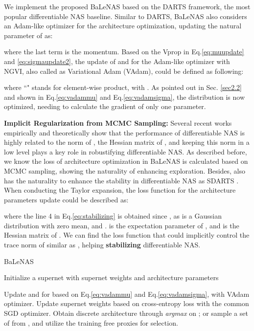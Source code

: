 \documentclass[10pt,twocolumn,letterpaper]{article}
\begin{document}
We implement the proposed BaLeNAS based on the DARTS \cite{liu2018darts} framework, the most popular differentiable NAS baseline. Similar to DARTS, BaLeNAS also considers an Adam-like optimizer for the architecture optimization, updating the natural parameter  of  as:

where the last term is the momentum. Based on the Vprop in Eq.\eqref{eq:muupdate} and \eqref{eq:sigmaupdate2}, the update of  and  for the Adam-like optimizer with NGVI, also called as Variational Adam (VAdam), could be defined as following:


where ``" stands for element-wise product,  with . As pointed out in Sec. \ref{sec2.2} and shown in Eq.\eqref{eq:vadammu} and Eq.\eqref{eq:vadamsigma}, the distribution   is now optimized, needing to calculate the gradient of only one parameter. 


\vspace{1mm}
\noindent\textbf{Implicit Regularization from MCMC Sampling:}
Several recent works \cite{zela2019understanding,chen2020stabilizing,chen2020drnas} empirically and theoretically show that the performance of differentiable NAS is highly related to the norm of , the Hessian matrix of , and keeping this norm in a low level plays a key role in robustifying differentiable NAS. As described before, we know the loss  of architecture optimization in BaLeNAS is calculated based on MCMC sampling, showing the naturality of enhancing exploration. Besides,  also has the naturality to enhance the stability in differentiable NAS as SDARTS \cite{chen2020stabilizing}. When conducting the Taylor expansion, the loss function for the architecture parameters update  could be described as: 

where the line 4 in Eq.\eqref{eq:stabilizing} is obtained since , as  is a Gaussian distribution with zero mean, and .  is the expectation parameter of , and  is the Hessian matrix of . We can find the loss function that could implicitly control the trace norm of  similar as \cite{chen2020stabilizing,chen2020drnas}, helping \textbf{stabilizing} differentiable NAS.





\begin{algorithm}[t]
\caption{BaLeNAS}
\label{alg:algorithm1}
Initialize a supernet with supernet weights  and architecture parameters 
\begin{algorithmic}[2]
\STATE Update {\color{red}  and  for  based on Eq.\eqref{eq:vadammu} and Eq.\eqref{eq:vadamsigma}, with VAdam optimizer.}
\STATE Update supernet weights  based on cross-entropy loss with the common SGD optimizer.
\ENDWHILE
\STATE Obtain discrete architecture  through \textit{argmax} on ; or {\color{red}sample a set of  from , and utilize the training free proxies for selection}.
\end{algorithmic}
\end{algorithm}
\end{document}
